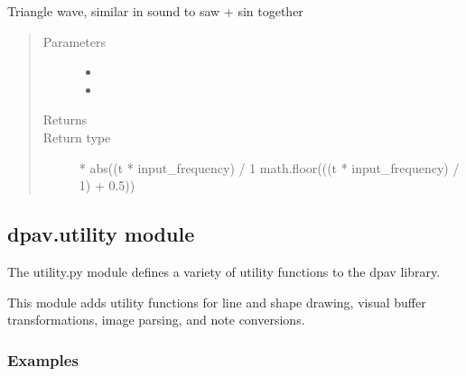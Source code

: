 \documentclass[letterpaper,10pt,english]{sphinxmanual}
\begin{document}
\begin{fulllineitems}
\begin{fulllineitems}
\label{\detokenize{dpav:dpav.audio.wave_table.triangle}}
\sphinxAtStartPar
Triangle wave, similar in sound to saw + sin together
\begin{quote}\begin{description}
\item[{Parameters}] \leavevmode\begin{itemize}
\item {} 
\sphinxAtStartPar
{} \textendash{} 

\item {} 
\sphinxAtStartPar
{} \textendash{} 

\end{itemize}

\item[{Returns}] \leavevmode
\sphinxAtStartPar


\item[{Return type}] \leavevmode
{} * abs((t * input\_frequency) / 1 \sphinxhyphen{} math.floor(((t * input\_frequency) / 1) + 0.5))

\end{description}\end{quote}

\end{fulllineitems}


\end{fulllineitems}



\subsection{dpav.utility module}
\label{\detokenize{dpav:module-dpav.utility}}\label{\detokenize{dpav:dpav-utility-module}}
\sphinxAtStartPar
The utility.py module defines a variety of utility functions to the dpav library.

\sphinxAtStartPar
This module adds utility functions for line and shape drawing, visual buffer
transformations, image parsing, and note conversions.
\subsubsection*{Examples}
\end{document}
